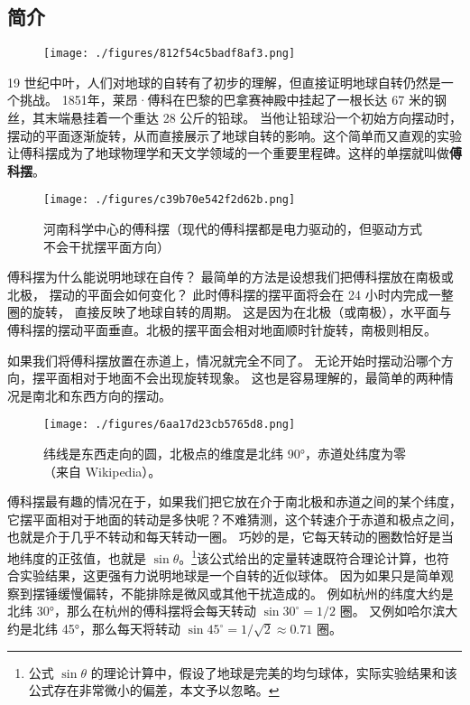 
\subsection{简介}

\begin{figure}[ht]
\centering
\texttt{[image: ./figures/812f54c5badf8af3.png]}
\caption{} \label{fig_FouPen_1}
\end{figure}

19 世纪中叶，人们对地球的自转有了初步的理解，但直接证明地球自转仍然是一个挑战。 1851年，莱昂·傅科在巴黎的巴拿赛神殿中挂起了一根长达 67 米的钢丝，其末端悬挂着一个重达 28 公斤的铅球。 当他让铅球沿一个初始方向摆动时，摆动的平面逐渐旋转，从而直接展示了地球自转的影响。这个简单而又直观的实验让傅科摆成为了地球物理学和天文学领域的一个重要里程碑。这样的单摆就叫做\textbf{傅科摆}。

\begin{figure}[ht]
\centering
\texttt{[image: ./figures/c39b70e542f2d62b.png]}
\caption{河南科学中心的傅科摆（现代的傅科摆都是电力驱动的，但驱动方式不会干扰摆平面方向）} \label{fig_FouPen_4}
\end{figure}

傅科摆为什么能说明地球在自传？ 最简单的方法是设想我们把傅科摆放在南极或北极， 摆动的平面会如何变化？ 此时傅科摆的摆平面将会在 24 小时内完成一整圈的旋转， 直接反映了地球自转的周期。 这是因为在北极（或南极），水平面与傅科摆的摆动平面垂直。北极的摆平面会相对地面顺时针旋转，南极则相反。

如果我们将傅科摆放置在赤道上，情况就完全不同了。 无论开始时摆动沿哪个方向，摆平面相对于地面不会出现旋转现象。 这也是容易理解的，最简单的两种情况是南北和东西方向的摆动。

\begin{figure}[ht]
\centering
\texttt{[image: ./figures/6aa17d23cb5765d8.png]}
\caption{纬线是东西走向的圆，北极点的维度是北纬 90°，赤道处纬度为零（来自 Wikipedia）。} \label{fig_FouPen_3}
\end{figure}


傅科摆最有趣的情况在于，如果我们把它放在介于南北极和赤道之间的某个纬度，它摆平面相对于地面的转动是多快呢？不难猜测，这个转速介于赤道和极点之间，也就是介于几乎不转动和每天转动一圈。 巧妙的是，它每天转动的圈数恰好是当地纬度的正弦值，也就是 $\sin\theta$。\footnote{公式 $\sin\theta$ 的理论计算中，假设了地球是完美的均匀球体，实际实验结果和该公式存在非常微小的偏差，本文予以忽略。}该公式给出的定量转速既符合理论计算，也符合实验结果，这更强有力说明地球是一个自转的近似球体。 因为如果只是简单观察到摆锤缓慢偏转，不能排除是微风或其他干扰造成的。 例如杭州的纬度大约是北纬 30°，那么在杭州的傅科摆将会每天转动 $\sin 30^\circ = 1/2$ 圈。 又例如哈尔滨大约是北纬 45°，那么每天将转动 $\sin 45^\circ = 1/\sqrt{2}\approx 0.71$ 圈。


